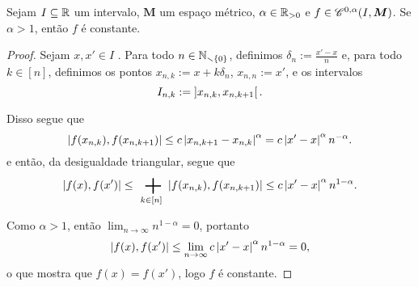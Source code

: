 \begin{proposition}
Sejam $I \subseteq \mathbb{R}$ um intervalo, $\bm M$ um espaço métrico, $\alpha \in \mathbb{R}_{>0}$ e $f \in \mathscr{C}^{0,\alpha}(I, \bm M)$. Se $\alpha>1$, então $f$ é constante.
\end{proposition}
\begin{proof}
Sejam $x, x' \in I$ . Para todo $n \in \mathbb{N}_{\smallsetminus\{0\}}$, definimos $\delta_n := \frac{x'-x}{n}$ e, para todo $k \in [n]$, definimos os pontos $x_{n,k} := x + k\delta_n$, $x_{n,n} := x'$, e os intervalos
	\begin{equation*}
	I_{n,k} := \left]{x_{n,k}},{x_{n,k+1}}\right[.
	\end{equation*}

Disso segue que
	\begin{equation*}
	\left\vert{f(x_{n,k})},{f(x_{n,k+1})}\right\vert \leq c \left\vert{x_{n,k+1} - x_{n,k}}\right\vert^\alpha = c \left\vert{x'-x}\right\vert^\alpha n^{-\alpha}.
	\end{equation*}
e então, da desigualdade triangular, segue que
	\begin{equation*}
	\dist{f(x)}{f(x')} \leq \sum_{k \in [n]} \dist{f(x_{n,k})}{f(x_{n,k+1})} \leq c \abs{x'-x}^\alpha n^{1-\alpha}.
	\end{equation*}

Como $\alpha > 1$, então $\lim_{n \to \infty} n^{1-\alpha} = 0$, portanto
	\begin{equation*}
	\left\vert{f(x)},{f(x')}\right\vert \leq \lim_{n \to \infty} c \left\vert{x'-x}\right\vert^\alpha n^{1-\alpha} = 0,
	\end{equation*}
o que mostra que $f(x) = f(x')$, logo $f$ é constante.
\end{proof}









